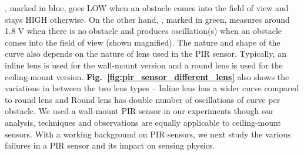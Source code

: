 \cout, marked in blue, goes LOW when an obstacle comes into the field of view %
and stays HIGH otherwise. On the other hand, %
\aout, marked in green, measures around 1.8 V when there is no obstacle and produces oscillation(s) when an obstacle comes into the field of view (shown magnified). 
The nature and shape of the \aout curve also depends on the nature of lens used in the PIR sensor. Typically, an inline lens is used for the wall-mount version and a round lens is used for the ceiling-mount version. {\bfseries Fig.~\ref{fig:pir_sensor_different_lens}} also shows the variations in \aout between the two lens types -- \ca Inline lens has a wider curve compared to round lens and \cb Round lens has double number of oscillations of \aout curve per obstacle. We used a wall-mount PIR sensor in our experiments though our analysis, techniques and observations are equally applicable to ceiling-mount sensors. %
With a working background on PIR sensors, we next study the various failures in a PIR sensor and its impact on sensing physics.